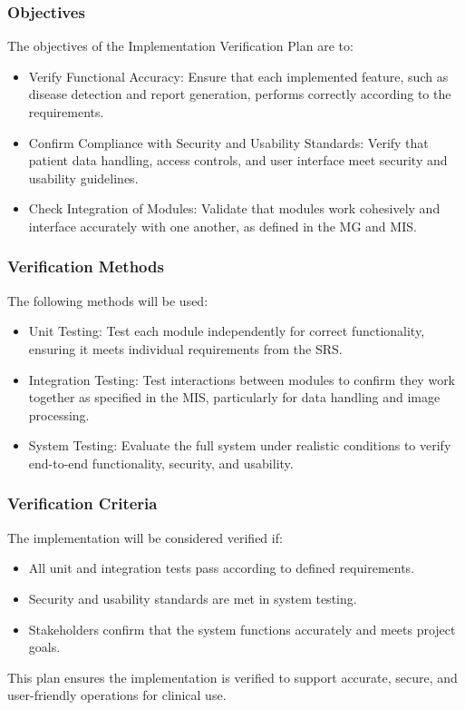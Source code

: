 \documentclass[12pt, titlepage]{article}
\begin{document}
\subsubsection{Objectives}
The objectives of the Implementation Verification Plan are to:
\begin{itemize}
  \item Verify Functional Accuracy: Ensure that each implemented feature, such as disease detection and report generation, performs correctly according to the requirements.
  \item Confirm Compliance with Security and Usability Standards: Verify that patient data handling, access controls, and user interface meet security and usability guidelines.
  \item Check Integration of Modules: Validate that modules work cohesively and interface accurately with one another, as defined in the MG and MIS.
\end{itemize}

\subsubsection{Verification Methods}
The following methods will be used:
\begin{itemize}
  \item Unit Testing: Test each module independently for correct functionality, ensuring it meets individual requirements from the SRS.
  \item Integration Testing: Test interactions between modules to confirm they work together as specified in the MIS, particularly for data handling and image processing.
  \item System Testing: Evaluate the full system under realistic conditions to verify end-to-end functionality, security, and usability.
\end{itemize}

\subsubsection{Verification Criteria}
The implementation will be considered verified if:
\begin{itemize}
  \item All unit and integration tests pass according to defined requirements.
  \item Security and usability standards are met in system testing.
  \item Stakeholders confirm that the system functions accurately and meets project goals.
\end{itemize}
This plan ensures the implementation is verified to support accurate, secure, and user-friendly operations for clinical use.
\end{document}
